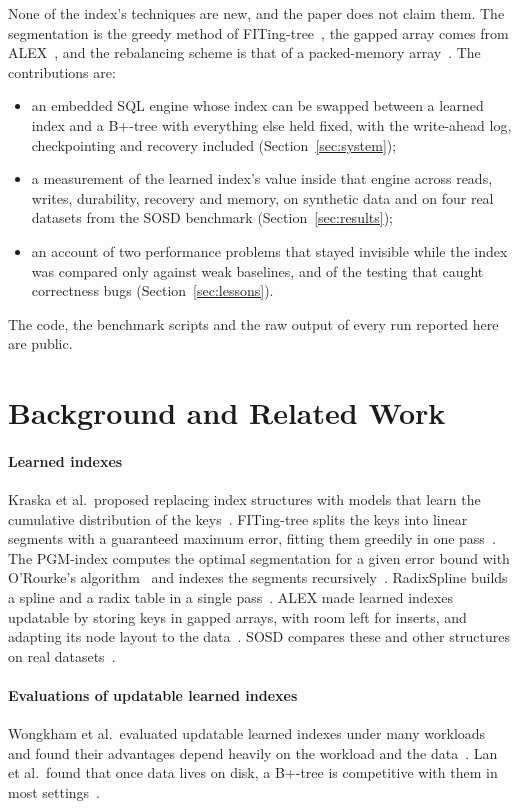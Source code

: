 \documentclass[conference]{IEEEtran}
\begin{document}
None of the index's techniques are new, and the paper does not claim them.
The segmentation is the greedy method of FITing-tree~\cite{galakatos2019},
the gapped array comes from ALEX~\cite{ding2020}, and the rebalancing scheme
is that of a packed-memory array~\cite{itai1981,bender2000}. The
contributions are:
\begin{itemize}
\item an embedded SQL engine whose index can be swapped between a learned
index and a B+-tree with everything else held fixed, with the write-ahead
log, checkpointing and recovery included (Section~\ref{sec:system});
\item a measurement of the learned index's value inside that engine across
reads, writes, durability, recovery and memory, on synthetic data and on
four real datasets from the SOSD benchmark (Section~\ref{sec:results});
\item an account of two performance problems that stayed invisible while
the index was compared only against weak baselines, and of the testing that
caught correctness bugs (Section~\ref{sec:lessons}).
\end{itemize}
The code, the benchmark scripts and the raw output of every run reported
here are public.

\section{Background and Related Work}

\paragraph{Learned indexes} Kraska et al.\ proposed replacing index
structures with models that learn the cumulative distribution of the
keys~\cite{kraska2018}. FITing-tree splits the keys into linear segments
with a guaranteed maximum error, fitting them greedily in one
pass~\cite{galakatos2019}. The PGM-index computes the optimal segmentation
for a given error bound with O'Rourke's algorithm~\cite{orourke1981} and
indexes the segments recursively~\cite{ferragina2020}. RadixSpline builds a
spline and a radix table in a single pass~\cite{kipf2020}. ALEX made learned
indexes updatable by storing keys in gapped arrays, with room left for
inserts, and adapting its node layout to the data~\cite{ding2020}. SOSD
compares these and other structures on real datasets~\cite{marcus2020}.

\paragraph{Evaluations of updatable learned indexes} Wongkham et al.\
evaluated updatable learned indexes under many workloads and found their
advantages depend heavily on the workload and the data~\cite{wongkham2022}.
Lan et al.\ found that once data lives on disk, a B+-tree is competitive
with them in most settings~\cite{lan2023}.
\end{document}
